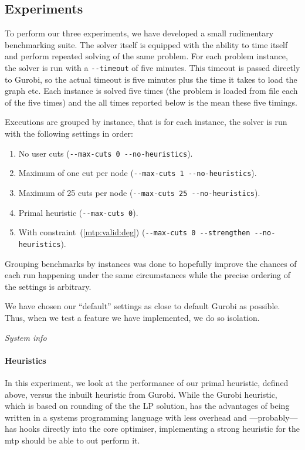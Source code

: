  \subsection{Experiments}

 To perform our three experiments, we have developed a small rudimentary benchmarking suite. The solver
 itself is equipped with the ability to time itself and perform repeated solving of the same problem.
 For each problem instance, the solver is run with a \texttt{-{}-timeout} of five minutes. This timeout
 is passed directly to Gurobi, so the actual timeout is five minutes plus the time it takes to load the
 graph etc. Each instance is solved five times (the problem is loaded from file each of the five times)
 and the all times reported below is the mean these five timings.

 Executions are grouped by instance, that is for each instance, the solver is run with the following
 settings in order:
 \begin{enumerate}
 \item No user cuts (\texttt{-{}-max-cuts 0 -{}-no-heuristics}).
 \item Maximum of one cut per node (\texttt{-{}-max-cuts 1 -{}-no-heuristics}).
 \item Maximum of 25 cuts per node (\texttt{-{}-max-cuts 25 -{}-no-heuristics}).
 \item Primal heuristic (\texttt{-{}-max-cuts 0}).
 \item With constraint~(\ref{mtp:valid:deg}) (\texttt{-{}-max-cuts 0 -{}-strengthen -{}-no-heuristics}).
 \end{enumerate}
 Grouping benchmarks by instances was done to hopefully improve the chances of each run happening
 under the same circumstances while the precise ordering of the settings is arbitrary.

 We have chosen our ``default'' settings as close to default Gurobi as possible. Thus, when we test
 a feature we have implemented, we do so isolation.
 
\textit{System info}

\paragraph{Heuristics}
In this experiment, we look at the performance of our primal heuristic, defined above, versus
the inbuilt heuristic from Gurobi. While the Gurobi heuristic, which is based on rounding
of the the LP solution, has the advantages of being written in a systems programming language
with less overhead and ---probably--- has hooks directly into the core optimiser,
implementing a strong heuristic for the \gls{mtp} should be able to out perform it.

